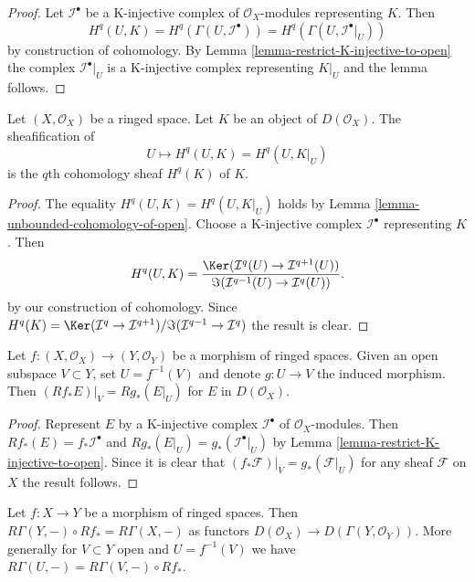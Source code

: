 \begin{proof}
Let $\mathcal{I}^\bullet$ be a K-injective complex of $\mathcal{O}_X$-modules
representing $K$. Then
$$
H^q(U, K) = H^q(\Gamma(U, \mathcal{I}^\bullet)) =
H^q(\Gamma(U, \mathcal{I}^\bullet|_U))
$$
by construction of cohomology. By Lemma \ref{lemma-restrict-K-injective-to-open}
the complex $\mathcal{I}^\bullet|_U$ is a K-injective complex
representing $K|_U$ and the lemma follows.
\end{proof}

\begin{lemma}
\label{lemma-sheafification-cohomology}
Let $(X, \mathcal{O}_X)$ be a ringed space. Let $K$ be an object of
$D(\mathcal{O}_X)$. The sheafification of
$$
U \mapsto H^q(U, K) = H^q(U, K|_U)
$$
is the $q$th cohomology sheaf $H^q(K)$ of $K$.
\end{lemma}

\begin{proof}
The equality $H^q(U, K) = H^q(U, K|_U)$ holds by
Lemma \ref{lemma-unbounded-cohomology-of-open}.
Choose a K-injective complex $\mathcal{I}^\bullet$ representing $K$.
Then
$$
H^q(U, K) =
\frac{\Ker(\mathcal{I}^q(U) \to \mathcal{I}^{q + 1}(U))}
{\Im(\mathcal{I}^{q - 1}(U) \to \mathcal{I}^q(U))}.
$$
by our construction of cohomology. Since
$H^q(K) = \Ker(\mathcal{I}^q \to \mathcal{I}^{q + 1})/
\Im(\mathcal{I}^{q - 1} \to \mathcal{I}^q)$ the result is clear.
\end{proof}

\begin{lemma}
\label{lemma-restrict-direct-image-open}
Let $f : (X, \mathcal{O}_X) \to (Y, \mathcal{O}_Y)$ be a morphism of ringed
spaces. Given an open subspace $V \subset Y$, set $U = f^{-1}(V)$ and denote
$g : U \to V$ the induced morphism. Then
$(Rf_*E)|_V = Rg_*(E|_U)$ for $E$ in $D(\mathcal{O}_X)$.
\end{lemma}

\begin{proof}
Represent $E$ by a K-injective complex $\mathcal{I}^\bullet$ of
$\mathcal{O}_X$-modules. Then $Rf_*(E) = f_*\mathcal{I}^\bullet$
and $Rg_*(E|_U) = g_*(\mathcal{I}^\bullet|_U)$ by
Lemma \ref{lemma-restrict-K-injective-to-open}.
Since it is clear that $(f_*\mathcal{F})|_V = g_*(\mathcal{F}|_U)$
for any sheaf $\mathcal{F}$ on $X$ the result follows.
\end{proof}

\begin{lemma}
\label{lemma-Leray-unbounded}
Let $f : X \to Y$ be a morphism of ringed spaces.
Then $R\Gamma(Y, -) \circ Rf_* = R\Gamma(X, -)$ as functors
$D(\mathcal{O}_X) \to D(\Gamma(Y, \mathcal{O}_Y))$.
More generally for $V \subset Y$ open and $U = f^{-1}(V)$
we have $R\Gamma(U, -) = R\Gamma(V, -) \circ Rf_*$.
\end{lemma}

